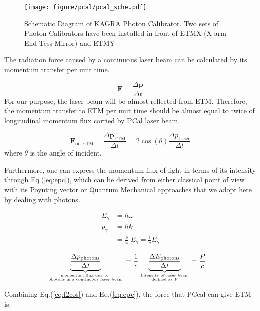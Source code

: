 \begin{figure}[bt]
\centering
\texttt{[image: figure/pcal/pcal\_sche.pdf]}
\caption[Schematic Diagram of KAGRA Photon Calibrator]{Schematic Diagram of KAGRA Photon Calibrator. Two sets of Photon Calibrators have been installed in front of ETMX (X-arm End-Tess-Mirror) and ETMY  }
\label{fig:pcal_sche}
\end{figure}

The radiation force caused by a continuous laser beam can be calculated by its momentum transfer per unit time.

\begin{equation}
    \mathbf{F} = \frac{\Delta \mathbf{p}}{\Delta t}
\end{equation}
For our purpose, the laser beam will be almost reflected from ETM. Therefore, the momentum transfer to ETM per unit time should be almost equal to twice of longitudinal momentum flux carried by PCal laser beam.

\begin{equation}
\label{eq:f2cos}
    \mathbf{F}_\text{on ETM} = \frac{\Delta \mathbf{p}_\text{ETM}}{\Delta t}
    = 2 \cos(\theta) \frac{\Delta p_\text{Laser} }{\Delta t}
\end{equation}
where $\theta$ is the angle of incident.

Furthermore, one can express the momentum flux of light in terms of its intensity through Eq.(\ref{eq:epc}), which can be derived from either classical point of view with its Poynting vector or Quantum Mechanical approaches that we adopt here by dealing with photons. 

\begin{align}
   E_{\gamma} &= \hbar \omega \\
   p_{\gamma} &= \hbar k \\
              &= \frac{k}{\omega} ~ E_{\gamma} = \frac{1}{c}E_{\gamma}
\end{align}

\begin{align}
\label{eq:epc}
   \underbrace{\frac{\Delta p_{\text{photons}}}{\Delta t}}_{\text{momentum flux due to }\atop \text{photons in a continuous laser beam}}
   &= \frac{1}{c}
   \underbrace{ \frac{\Delta E_{\text{photons}}}{\Delta t} }_{\text{Intensity of laser beam}\atop \text{defined as } P}
   = \frac{P}{c} 
\end{align}

Combining Eq.(\ref{eq:f2cos}) and Eq.(\ref{eq:epc}), the force that PCcal can give ETM is:

